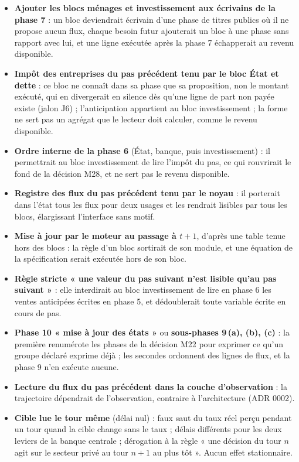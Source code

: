 \documentclass[11pt,a4paper]{article}
\begin{document}
\begin{itemize}
\item \textbf{Ajouter les blocs ménages et investissement aux écrivains de la phase 7} : un bloc deviendrait écrivain d'une phase de titres publics où il ne propose aucun flux, chaque besoin futur ajouterait un bloc à une phase sans rapport avec lui, et une ligne exécutée après la phase 7 échapperait au revenu disponible.
\item \textbf{Impôt des entreprises du pas précédent tenu par le bloc État et dette} : ce bloc ne connaît dans sa phase que sa proposition, non le montant exécuté, qui en divergerait en silence dès qu'une ligne de part non payée existe (jalon J6) ; l'anticipation appartient au bloc investissement ; la forme ne sert pas un agrégat que le lecteur doit calculer, comme le revenu disponible.
\item \textbf{Ordre interne de la phase 6} (État, banque, puis investissement) : il permettrait au bloc investissement de lire l'impôt du pas, ce qui rouvrirait le fond de la décision M28, et ne sert pas le revenu disponible.
\item \textbf{Registre des flux du pas précédent tenu par le noyau} : il porterait dans l'état tous les flux pour deux usages et les rendrait lisibles par tous les blocs, élargissant l'interface sans motif.
\item \textbf{Mise à jour par le moteur au passage à $t + 1$}, d'après une table tenue hors des blocs : la règle d'un bloc sortirait de son module, et une équation de la spécification serait exécutée hors de son bloc.
\item \textbf{Règle stricte « une valeur du pas suivant n'est lisible qu'au pas suivant »} : elle interdirait au bloc investissement de lire en phase 6 les ventes anticipées écrites en phase 5, et dédoublerait toute variable écrite en cours de pas.
\item \textbf{Phase 10 « mise à jour des états »} ou \textbf{sous-phases 9\,(a), (b), (c)} : la première renumérote les phases de la décision M22 pour exprimer ce qu'un groupe déclaré exprime déjà ; les secondes ordonnent des lignes de flux, et la phase 9 n'en exécute aucune.
\item \textbf{Lecture du flux du pas précédent dans la couche d'observation} : la trajectoire dépendrait de l'observation, contraire à l'architecture (ADR 0002).
\item \textbf{Cible lue le tour même} (délai nul) : faux saut du taux réel perçu pendant un tour quand la cible change sans le taux ; délais différents pour les deux leviers de la banque centrale ; dérogation à la règle « une décision du tour $n$ agit sur le secteur privé au tour $n + 1$ au plus tôt ». Aucun effet stationnaire.

\end{itemize}
\end{document}
